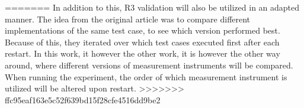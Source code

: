 =======
In addition to this, R3 validation\cite{Bokhari2020r3} will also be utilized in an adapted manner. The idea from the original article was to compare different implementations of the same test case, to see which version performed best. Because of this, they iterated over which test cases executed first after each restart. In this work, it however the other work, it is however the other way around, where different versions of measurement instruments will be compared. When running the experiment, the order of which measurement instrument is utilized will be altered upon restart.
>>>>>>> ffc95eaf163e5c52f639bd15f28cfe4516dd9be2

